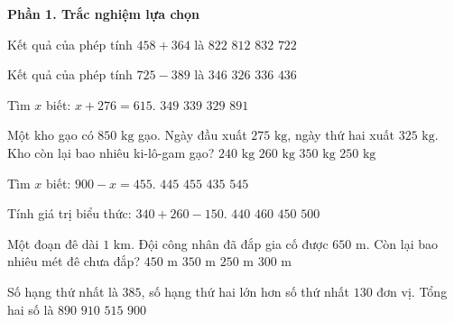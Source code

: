 \textbf{Phần 1. Trắc nghiệm lựa chọn}

\begin{ex} %
Kết quả của phép tính $458 + 364$ là
\choice
{\True $822$}
{$812$}
{$832$}
{$722$}
\end{ex}

\begin{ex} %
Kết quả của phép tính $725 - 389$ là
\choice
{$346$}
{$326$}
{\True $336$}
{$436$}
\end{ex}

\begin{ex} %
Tìm $x$ biết: $x + 276 = 615$.
\choice
{$349$}
{\True $339$}
{$329$}
{$891$}
\end{ex}

\begin{ex} %
Một kho gạo có $850\text{ kg}$ gạo. Ngày đầu xuất $275\text{ kg}$, ngày thứ hai xuất $325\text{ kg}$. Kho còn lại bao nhiêu ki-lô-gam gạo?
\choice
{$240\text{ kg}$}
{$260\text{ kg}$}
{$350\text{ kg}$}
{\True $250\text{ kg}$}
\end{ex}

\begin{ex} %
Tìm $x$ biết: $900 - x = 455$.
\choice
{\True $445$}
{$455$}
{$435$}
{$545$}
\end{ex}

\begin{ex} %
Tính giá trị biểu thức: $340 + 260 - 150$.
\choice
{$440$}
{$460$}
{\True $450$}
{$500$}
\end{ex}

\begin{ex} %
Một đoạn đê dài $1\text{ km}$. Đội công nhân đã đắp gia cố được $650\text{ m}$. Còn lại bao nhiêu mét đê chưa đắp?
\choice
{$450\text{ m}$}
{\True $350\text{ m}$}
{$250\text{ m}$}
{$300\text{ m}$}
\end{ex}

\begin{ex} %
Số hạng thứ nhất là $385$, số hạng thứ hai lớn hơn số thứ nhất $130$ đơn vị. Tổng hai số là
\choice
{$890$}
{$910$}
{$515$}
{\True $900$}
\end{ex}

